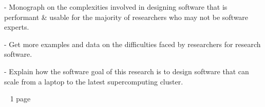- Monograph on the complexities involved in designing software that is performant \& usable for the majority of researchers who may not be software experts.

- Get more examples and data on the difficulties faced by researchers for research software.

- Explain how the software goal of this research is to design software that can scale from a laptop to the latest supercomputing cluster.

~ 1 page